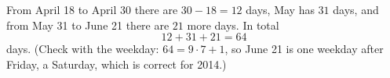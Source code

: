 From April 18 to April 30 there are $30-18=12$ days, May has $31$ days, and from May 31 to June 21 there are $21$ more days. In total
\[
12+31+21=\boxed{64}
\]
days. (Check with the weekday: $64=9\cdot7+1$, so June 21 is one weekday after Friday, a Saturday, which is correct for 2014.)
